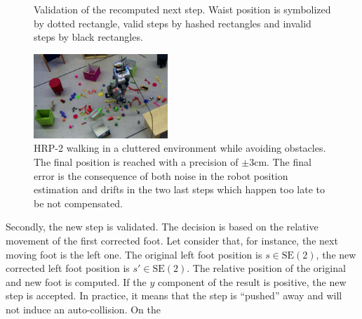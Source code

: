 \begin{figure}[ht!]
\begin{center}
  \end{center}
  \caption{Validation of the recomputed next step. Waist position is
    symbolized by dotted rectangle, valid steps by hashed rectangles
    and invalid steps by black rectangles.
    \label{fig:stepvalid}}
\end{figure}
%
%
\begin{figure}
  \begin{center}
    \includegraphics[width=0.45\textwidth]{fig/demo.jpg}
  \end{center}
  \caption{HRP-2 walking in a cluttered environment while avoiding
    obstacles. The final position is reached with a precision of $\pm
    3\mathrm{cm}$. The final error is the consequence of both noise in
    the robot position estimation and drifts in the two last steps
    which happen too late to be not compensated. \label{fig:scenario}}
\end{figure}
%
%
%
Secondly, the new step is validated. The decision is based on the
relative movement of the first corrected foot. Let consider that, for
instance, the next moving foot is the left one. The original left foot
position is \mbox{$s \in \text{SE}(2)$}, the new corrected left foot
position is \mbox{$s' \in \text{SE}(2)$}. The relative position of the
original and new foot is computed. If the $y$ component of the result
is positive, the new step is accepted. In practice, it means that the
step is ``pushed'' away and will not induce an auto-collision. On the
